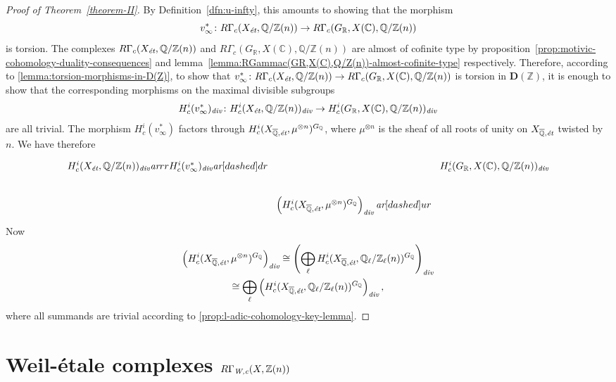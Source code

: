 \documentclass[draft,leqno,12pt]{article}
\theoremstyle{plain}
\theoremstyle{definition}
\newcommand{\ZZ}{\mathbb{Z}}
\newcommand{\QQ}{\mathbb{Q}}
\newcommand{\RR}{\mathbb{R}}
\newcommand{\CC}{\mathbb{C}}
\renewcommand{\div}{\text{\it div}}
\newcommand{\Wc}{\text{\it W,c}}
\newcommand{\et}{\text{\it \'{e}t}}
\newcommand{\ar}{\text{\it ar}}
\begin{document}
\begin{proof}[Proof of Theorem~\ref{theorem-II}]
  By Definition~\ref{dfn:u-infty}, this amounts to showing that the morphism
  $$v_\infty^*\colon R\Gamma_c (X_\et, \QQ/\ZZ (n)) \to R\Gamma_c (G_\RR, X (\CC), \QQ/\ZZ (n))$$
  is torsion. The complexes $R\Gamma_c (X_\et, \QQ/\ZZ (n))$ and
  $R\Gamma_c (G_\RR, X (\CC), \QQ/\ZZ (n))$ are almost of cofinite type by
  proposition~\ref{prop:motivic-cohomology-duality-consequences} and
  lemma~\ref{lemma:RGammac(GR,X(C),Q/Z(n))-almost-cofinite-type} respectively.
  Therefore, according to \ref{lemma:torsion-morphisms-in-D(Z)}, to show that
  $v^*_\infty\colon R\Gamma_c (X_\et, \QQ/\ZZ (n)) \to R\Gamma_c (G_\RR, X
  (\CC), \QQ/\ZZ (n))$ is torsion in $\mathbf{D} (\ZZ)$, it is enough to show
  that the corresponding morphisms on the maximal divisible subgroups
  \[ H^i_c (v^*_\infty)_\div\colon H^i_c (X_\et, \QQ/\ZZ (n))_\div \to
     H^i_c (G_\RR, X (\CC), \QQ/\ZZ (n))_\div \]
  are all trivial. The morphism $H^i_c (v^*_\infty)$ factors through
  $H^i_c (X_{\overline{\QQ}, \text{\it \'{e}t}}, \mu^{\otimes n})^{G_\QQ}$, where
  $\mu^{\otimes n}$ is the sheaf of all roots of unity on
  $X_{\overline{\QQ}, \text{\it \'{e}t}}$ twisted by $n$.
  We have therefore
  \[ \begin{tikzcd}[column sep=0pt]
    H^i_c (X_\et, \QQ/\ZZ (n))_\div\ar{rr}{H^i_c (v^*_\infty)_\div}\ar[dashed]{dr} && H^i_c (G_\RR, X (\CC), \QQ/\ZZ (n))_\div\\
    & \left(H^i_c (X_{\overline{\QQ}, \text{\it \'{e}t}}, \mu^{\otimes n})^{G_\QQ}\right)_\div\ar[dashed]{ur}
  \end{tikzcd} \]
  Now
  \begin{multline*}
    \left(H^i_c (X_{\overline{\QQ}, \text{\it \'{e}t}}, \mu^{\otimes n})^{G_\QQ}\right)_\div \cong
    \left(\bigoplus_\ell H^i_c (X_{\overline{\QQ}, \text{\it \'{e}t}}, \QQ_\ell/\ZZ_\ell (n))^{G_\QQ}\right)_\div \\
    \cong
    \bigoplus_\ell \left(H^i_c (X_{\overline{\QQ}, \text{\it \'{e}t}}, \QQ_\ell/\ZZ_\ell (n))^{G_\QQ}\right)_\div,
  \end{multline*}
  where all summands are trivial according to
  \ref{prop:l-adic-cohomology-key-lemma}.
\end{proof}


\section{Weil-\'{e}tale complexes $R\Gamma_\Wc (X, \ZZ(n))$}
\label{sec:RGamma-Wc}
\end{document}
